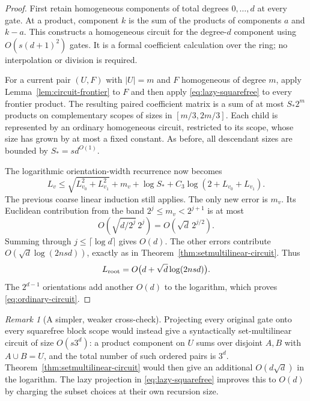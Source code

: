 \documentclass[11pt]{article}
\theoremstyle{definition}
\theoremstyle{remark}
\newtheorem{remark}[theorem]{Remark}
\begin{document}
\begin{proof}
First retain homogeneous components of total degrees $0,\ldots,d$
at every gate.  At a product, component $k$ is the sum of the
products of components $a$ and $k-a$.  This constructs a
homogeneous circuit for the degree-$d$ component using
$O(s(d+1)^2)$ gates.  It is a formal coefficient calculation over
the ring; no interpolation or division is required.

For a current pair $(U,F)$ with $|U|=m$ and $F$ homogeneous of
degree $m$, apply Lemma~\ref{lem:circuit-frontier} to $F$ and
then apply \eqref{eq:lazy-squarefree} to every frontier product.
The resulting paired coefficient matrix is a sum of at most
$S_*2^m$ products on complementary scopes of sizes in
$[m/3,2m/3]$.  Each child is represented by an ordinary homogeneous
circuit, restricted to its scope, whose size has grown by at most
a fixed constant.  As before, all descendant sizes are bounded by
$S_*=s d^{O(1)}$.

The logarithmic orientation-width recurrence now becomes
\begin{equation}
\label{eq:ordinary-width-recurrence}
 L_v\le\sqrt{L_{v_0}^2+L_{v_1}^2}
       +m_v+\log S_*+C_3\log(2+L_{v_0}+L_{v_1}).
\end{equation}
The previous coarse linear induction still applies.  The only
new error is $m_v$.  Its Euclidean contribution from the band
$2^j\le m_v<2^{j+1}$ is at most
\[
 O\!\left(\sqrt{d/2^j}\,2^j\right)
 =O(\sqrt d\,2^{j/2}).
\]
Summing through $j\le\lceil\log d\rceil$ gives $O(d)$.
The other errors contribute $O(\sqrt d\log(2nsd))$, exactly
as in Theorem~\ref{thm:setmultilinear-circuit}.  Thus
\[
 L_{\rm root}=O\bigl(d+\sqrt d\log(2nsd)\bigr).
\]
The $2^{d-1}$ orientations add another $O(d)$ to the logarithm,
which proves \eqref{eq:ordinary-circuit}.
\end{proof}

\begin{remark}[A simpler, weaker cross-check]
Projecting every original gate onto every squarefree block scope
would instead give a syntactically set-multilinear circuit of size
$O(s3^d)$: a product component on $U$ sums over disjoint
$A,B$ with $A\cup B=U$, and the total number of such ordered
pairs is $3^d$.  Theorem~\ref{thm:setmultilinear-circuit} would
then give an additional $O(d\sqrt d)$ in the logarithm.  The
lazy projection in \eqref{eq:lazy-squarefree} improves this to
$O(d)$ by charging the subset choices at their own recursion size.
\end{remark}
\end{document}
